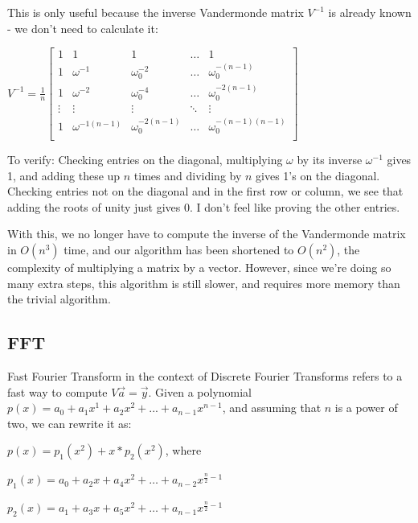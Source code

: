 \documentclass{article}
\begin{document}
This is only useful because the inverse Vandermonde matrix $V^{-1}$ is already known - we don't need to calculate it:

\centerline{
    $ V^{-1} = \displaystyle\frac{1}{n}
    \begin{bmatrix}
        1 & 1 & 1 & \ldots & 1 \\
        1 & \omega^{-1} & \omega_0^{-2} & \ldots & \omega_0^{-(n-1)} \\
        1 & \omega^{-2} & \omega_0^{-4} & \ldots & \omega_0^{-2(n-1)} \\
        \vdots & \vdots & \vdots & \ddots & \vdots \\
        1 & \omega^{-1(n-1)} & \omega_0^{-2(n-1)} & \ldots & \omega_0^{-(n-1)(n-1)} \\
    \end{bmatrix}
    $
}

To verify: Checking entries on the diagonal, multiplying $\omega$ by its inverse $\omega^{-1}$ gives 1, and adding these up $n$ times and dividing by $n$ gives 1's on the diagonal. Checking entries not on the diagonal and in the first row or column, we see that adding the roots of unity just gives 0. I don't feel like proving the other entries.

With this, we no longer have to compute the inverse of the Vandermonde matrix in $O(n^3)$ time, and our algorithm has been shortened to $O(n^2)$, the complexity of multiplying a matrix by a vector. However, since we're doing so many extra steps, this algorithm is still slower, and requires more memory than the trivial algorithm.

\subsection{FFT}
Fast Fourier Transform in the context of Discrete Fourier Transforms refers to a fast way to compute $V\vec{a}=\vec{y}$. Given a polynomial $p(x)=a_0 + a_1x^1 + a_2x^2 + ... + a_{n-1}x^{n-1}$, and assuming that $n$ is a power of two, we can rewrite it as:

\begin{center}
    $p(x) = p_1(x^2) + x * p_2(x^2)$, where

    $p_1(x) = a_0 + a_2x + a_4x^2 + \ldots + a_{n-2}x^{\frac{n}{2}-1}$

    $p_2(x) = a_1 + a_3x + a_5x^2 + \ldots + a_{n-1}x^{\frac{n}{2}-1}$
\end{center}
\end{document}
